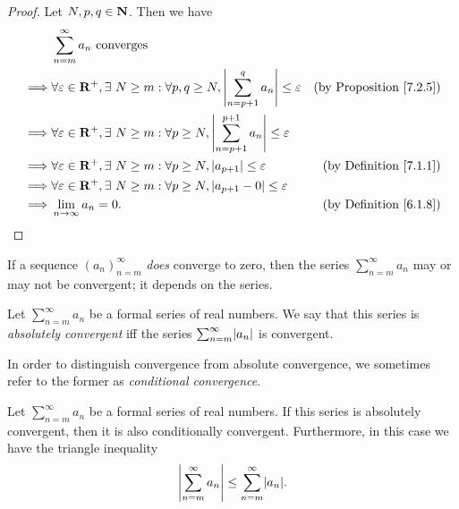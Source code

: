 \begin{proof}
    Let \(N, p, q \in \mathbf{N}\).
    Then we have
    \begin{align*}
                 & \sum_{n = m}^\infty a_n \text{ converges}                                                                                                                     \\
        \implies & \forall \varepsilon \in \mathbf{R}^+, \exists\ N \geq m : \forall p, q \geq N, \left\lvert\sum_{n = p + 1}^q a_n\right\rvert \leq \varepsilon    & \text{(by Proposition \ref{7.2.5})} \\
        \implies & \forall \varepsilon \in \mathbf{R}^+, \exists\ N \geq m : \forall p \geq N, \left\lvert\sum_{n = p + 1}^{p + 1} a_n\right\rvert \leq \varepsilon                                       \\
        \implies & \forall \varepsilon \in \mathbf{R}^+, \exists\ N \geq m : \forall p \geq N, \left\lvert a_{p + 1}\right\rvert \leq \varepsilon                    & \text{(by Definition \ref{7.1.1})}  \\
        \implies & \forall \varepsilon \in \mathbf{R}^+, \exists\ N \geq m : \forall p \geq N, \left\lvert a_{p + 1} - 0\right\rvert \leq \varepsilon                                                      \\
        \implies & \lim_{n \to \infty} a_n = 0.                                                                                            & \text{(by Definition \ref{6.1.8})}
    \end{align*}
\end{proof}

\begin{note}
    If a sequence \((a_n)_{n = m}^\infty\) \emph{does} converge to zero, then the series \(\sum_{n = m}^\infty a_n\) may or may not be convergent;
    it depends on the series.
\end{note}

\setcounter{theorem}{7}
\begin{definition}\label{7.2.8}
    Let \(\sum_{n = m}^\infty a_n\) be a formal series of real numbers.
    We say that this series is \emph{absolutely convergent} iff the series \(\sum_{n = m}^\infty \abs{a_n}\) is convergent.
\end{definition}

\begin{note}
    In order to distinguish convergence from absolute convergence, we sometimes refer to the former as \emph{conditional convergence}.
\end{note}

\begin{proposition}\label{7.2.9}
    Let \(\sum_{n = m}^\infty a_n\) be a formal series of real numbers.
    If this series is absolutely convergent, then it is also conditionally convergent.
    Furthermore, in this case we have the triangle inequality
    \[
        \abs{\sum_{n = m}^\infty a_n} \leq \sum_{n = m}^\infty \abs{a_n}.
    \]
\end{proposition}

